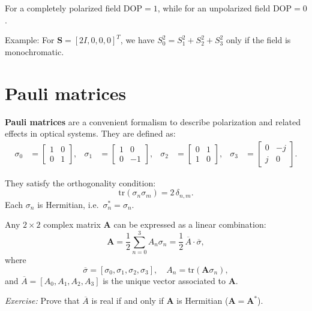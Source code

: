 For a completely polarized field $\mathrm{DOP}=1$,  
while for an unpolarized field $\mathrm{DOP}=0$.

\medskip
Example:  
For $\mathbf{S} = [2I, 0, 0, 0]^T$, we have $S_0^2 = S_1^2 + S_2^2 + S_3^2$ only if the field is monochromatic.

\section{Pauli matrices}

\textbf{Pauli matrices} are a convenient formalism to describe polarization and related effects in optical systems.  
They are defined as:
\begin{align}
    \sigma_0 &= 
    \begin{bmatrix}1 & 0\\ 0 & 1\end{bmatrix}, &
    \sigma_1 &= 
    \begin{bmatrix}1 & 0\\ 0 & -1\end{bmatrix}, &
    \sigma_2 &=
    \begin{bmatrix}0 & 1\\ 1 & 0\end{bmatrix}, &
    \sigma_3 &=
    \begin{bmatrix}0 & -j\\ j & 0\end{bmatrix}.
\end{align}

They satisfy the orthogonality condition:
\begin{equation}
    \mathrm{tr}(\sigma_n\sigma_m) = 2\,\delta_{n,m}.
\end{equation}
Each $\sigma_n$ is Hermitian, i.e.\ $\sigma_n^* = \sigma_n$.

Any $2\times2$ complex matrix $\mathbf{A}$ can be expressed as a linear combination:
\begin{equation}
    \mathbf{A} = \frac{1}{2}\sum_{n=0}^{3} A_n\sigma_n 
    = \frac{1}{2}\,\overline{A}\cdot\overline{\sigma},
\end{equation}
where
\[
\overline{\sigma} = [\sigma_0, \sigma_1, \sigma_2, \sigma_3],
\quad
A_n = \mathrm{tr}(\mathbf{A}\sigma_n),
\]
and $\overline{A}=[A_0,A_1,A_2,A_3]$ is the unique vector associated to $\mathbf{A}$.

\textit{Exercise:}  
Prove that $\overline{A}$ is real if and only if $\mathbf{A}$ is Hermitian ($\mathbf{A}=\mathbf{A}^*$).

